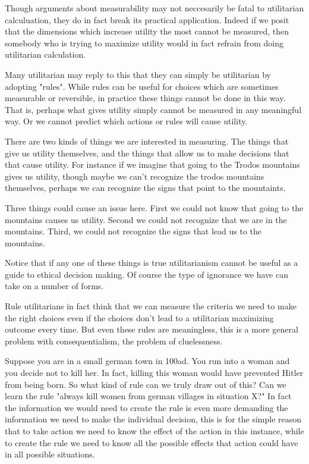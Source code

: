 \documentclass[12pt]{report}
\numberwithin{equation}{section}
\begin{document}
Though arguments about measurability may not neccesarily be fatal to utilitarian calculuation, they do in fact break its practical application. Indeed if we posit that the dimensions which increase utility the most cannot be measured, then somebody who is trying to maximize utility would in fact refrain from doing utilitarian calculation. 

Many utilitarian may reply to this that they can simply be utilitarian by adopting "rules". While rules can be useful for choices which are sometimes measurable or reversible, in practice these things cannot be done in this way. That is, perhaps what gives utility simply cannot be measured in any meaningful way. Or we cannot predict which actions or rules will cause utility. 


There are two kinds of things we are interested in measuring. The things that give us utility themselves, and the things that allow us to make decisions that that cause utility. For instance if we imagine that going to the Trodos mountains gives us utility, though maybe we can't recognize the trodos mountains themselves, perhaps we can recognize the signs that point to the mountaints. 

Three things could cause an issue here. First we could not know that going to the mountains causes us utility. Second we could not recognize that we are in the mountains. Third, we could not recognize the signs that lead us to the mountains. 

Notice that if any one of these things is true utilitarianism cannot be useful as a guide to ethical decision making. Of course the type of ignorance we have can take on a number of forms. 

Rule utilitarians in fact think that we can measure the criteria we need to make the right choices even if the choices don't lead to a utilitarian maximizing outcome every time. But even these rules are meaningless, this is a more general problem with consequentialism, the problem of cluelessness.

Suppose you are in a small german town in 100ad. You run into a woman and you decide not to kill her. In fact, killing this woman would have prevented Hitler from being born. So what kind of rule can we truly draw out of this? Can we learn the rule "always kill women from german villages in situation X?" In fact the information we would need to create the rule is even more demanding the information we need to make the individual decision, this is for the simple reason that to take action we need to know the effect of the action in this instance, while to create the rule we need to know all the possible effects that action could have in all possible situations. 
\end{document}
